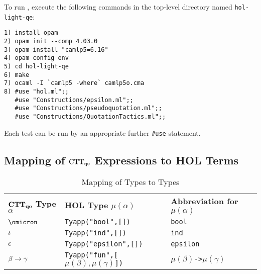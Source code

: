 \documentclass[fleqn]{llncs}
\begin{document}
\iffalse
It should be further remarked that our fork, from late April 2017, is not fully
up-to-date with respect to {\HL}. In particular, this means that it is best to
compile it with \textsc{OCaml 4.03.0} and \textsc{camlp5 6.16},
both available from \textsc{opam}.
\fi

To run {\HLQE}, execute the following commands in the {\HLQE}
top-level directory named \texttt{hol-light-qe}:

\begin{lstlisting}
1) install opam
2) opam init --comp 4.03.0                                                      
3) opam install "camlp5=6.16" 
4) opam config env
5) cd hol-light-qe
6) make
7) ocaml -I `camlp5 -where` camlp5o.cma                                        
8) #use "hol.ml";;
   #use "Constructions/epsilon.ml";;
   #use "Constructions/pseudoquotation.ml";;
   #use "Constructions/QuotationTactics.ml";;
\end{lstlisting}
\noindent Each test can be run by an appropriate further
\lstinline|#use| statement.

\subsection{Mapping of ${\rm CTT_{qe}}$ Expressions to HOL Terms}\label{subsec:mapping}

\begin{table}[b]
\bc
\begin{tabular}{|lll|}
\hline
\textbf{${\bf CTT_{qe}}$ Type $\alpha$} \hspace*{2ex}
  & \textbf{HOL Type $\mu(\alpha)$}
  & \textbf{Abbreviation for $\mu(\alpha)$}\\
$\omicron$ & \texttt{Tyapp("bool",[])} & \texttt{bool}\\
$\iota$ & \texttt{Tyapp("ind",[])} & \texttt{ind}\\
$\epsilon$ & \texttt{Tyapp("epsilon",[])} & \texttt{epsilon}\\
$\beta \rightarrow \gamma$ 
  & \texttt{Tyapp("fun",[\mbox{$\mu(\beta),\mu(\gamma)$}])} \hspace*{2ex}
  & \texttt{\mbox{$\mu(\beta)$}->\mbox{$\mu(\gamma)$}}\\  
\hline
\end{tabular}
\ec
\caption{Mapping of {\churchqe} Types to {\HOL} Types}\label{tab:types} 
\end{table}
\end{document}
